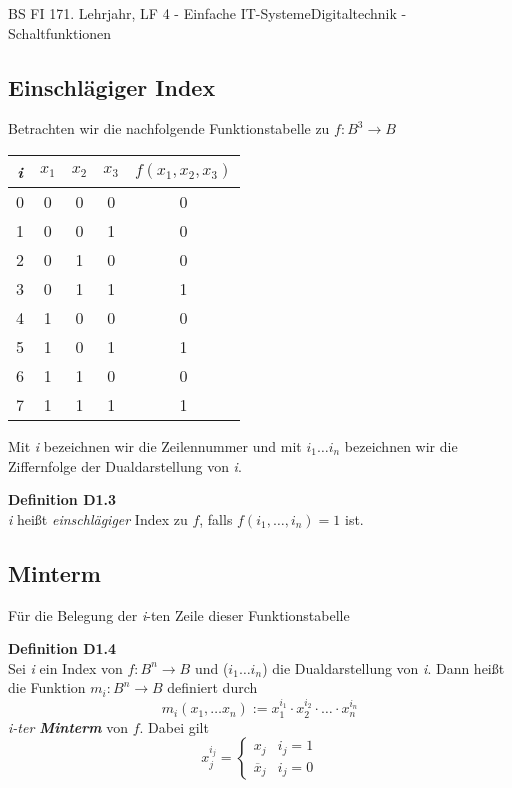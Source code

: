 \documentclass[11pt,twocolumn,oneside,openany,headings=optiontotoc,11pt,numbers=noenddot]{article}
\begin{document}
\begin{worksheet}{BS FI 17}{1. Lehrjahr, LF 4 - Einfache IT-Systeme}{Digitaltechnik - Schaltfunktionen}
		\subsection{Einschlägiger Index}
		Betrachten wir die nachfolgende Funktionstabelle zu \(f: B^3 \rightarrow B\)
		\begin{center}
			\begin{tabular}{|c|ccc|c|}
				\hline
				\textit{i} & \(x_1\) & \(x_2\) & \(x_3\) & \(f(x_1,x_2,x_3)\)\\
				\hline
				0 & 0 & 0 & 0 & 0\\
				\hline
				1 & 0 & 0 & 1 & 0\\
				\hline
				2 & 0 & 1 & 0 & 0\\
				\hline
				3 & 0 & 1 & 1 & 1\\
				\hline
				4 & 1 & 0 & 0 & 0\\
				\hline
				5 & 1 & 0 & 1 & 1\\
				\hline
				6 & 1 & 1 & 0 & 0\\
				\hline
				7 & 1 & 1 & 1 & 1\\
				\hline
			\end{tabular}
		\end{center}
		Mit \textit{i} bezeichnen wir die Zeilennummer und mit \(i_1 \ldots i_n\) bezeichnen wir die Ziffernfolge der Dualdarstellung von \textit{i}.
		\begin{framed}
			\textbf{Definition D1.3}\\ \textit{i} heißt \textit{einschlägiger} Index zu \(f\), falls \(f(i_1,\ldots,i_n) = 1\) ist.
		\end{framed}
		\subsection{Minterm}
		Für die Belegung der \textit{i}-ten Zeile dieser Funktionstabelle 
		\begin{framed}
			\textbf{Definition D1.4}\\ Sei \textit{i} ein Index von \(f: B^n \rightarrow B\) und (\(i_1\ldots i_n\)) die Dualdarstellung von \textit{i}. Dann heißt die Funktion \(m_i: B^n \rightarrow B\) definiert durch
			\[m_i(x_1,\ldots x_n) := x_{1}^{i_1}\cdot x_{2}^{i_2}\cdot\ldots\cdot x_{n}^{i_n}\]
			\textit{i-ter \textbf{Minterm}} von \(f\). Dabei gilt
			\[x_{j}^{i_j} = \begin{cases}x_j & i_j=1 \\ \overline x_j & i_j = 0\end{cases}\]
		\end{framed}

\end{worksheet}
\end{document}
